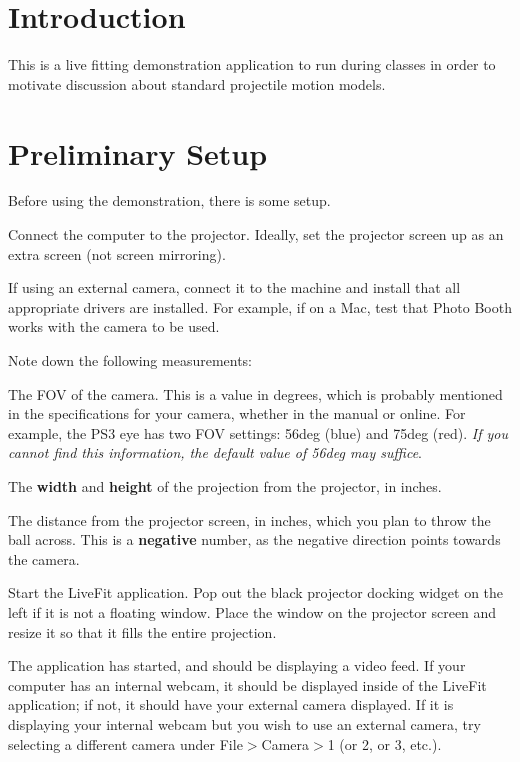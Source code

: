 \section*{Introduction}

This is a live fitting demonstration application to run during classes in order to motivate discussion about standard projectile motion models.

\section*{Preliminary Setup}

Before using the demonstration, there is some setup.


\begin{DoxyEnumerate}
\item Connect the computer to the projector. Ideally, set the projector screen up as an extra screen (not screen mirroring).
\item If using an external camera, connect it to the machine and install that all appropriate drivers are installed. For example, if on a Mac, test that Photo Booth works with the camera to be used.
\item Note down the following measurements\+:
\begin{DoxyItemize}
\item The F\+OV of the camera. This is a value in degrees, which is probably mentioned in the specifications for your camera, whether in the manual or online. For example, the P\+S3 eye has two F\+OV settings\+: 56deg (blue) and 75deg (red). {\itshape If you cannot find this information, the default value of 56deg may suffice}.
\item The {\bfseries width} and {\bfseries height} of the projection from the projector, in inches.
\item The distance from the projector screen, in inches, which you plan to throw the ball across. This is a {\bfseries negative} number, as the negative direction points towards the camera.
\end{DoxyItemize}
\item Start the Live\+Fit application. Pop out the black projector docking widget on the left if it is not a floating window. Place the window on the projector screen and resize it so that it fills the entire projection.
\item The application has started, and should be displaying a video feed. If your computer has an internal webcam, it should be displayed inside of the Live\+Fit application; if not, it should have your external camera displayed. If it is displaying your internal webcam but you wish to use an external camera, try selecting a different camera under File$>$Camera$>$1 (or 2, or 3, etc.).

\end{DoxyEnumerate}

